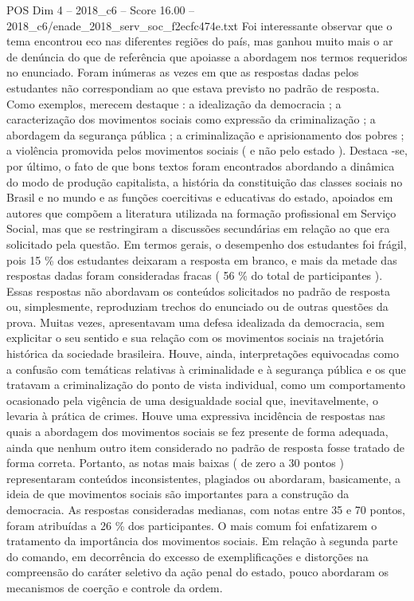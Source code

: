 \begin{textsample}{POS Dim 4 – 2018\_c6 – Score 16.00 – 2018\_c6/enade\_2018\_serv\_soc\_f2ecfc474e.txt}
Foi interessante observar que o tema encontrou eco nas diferentes regiões do país, mas ganhou muito mais o ar de denúncia do que de referência que apoiasse a abordagem nos termos requeridos no enunciado.
Foram inúmeras as vezes em que as respostas dadas pelos estudantes não correspondiam ao que estava previsto no padrão de resposta.
Como exemplos, merecem destaque : a idealização da democracia ; a caracterização dos movimentos sociais como expressão da criminalização ; a abordagem da segurança pública ; a criminalização e aprisionamento dos pobres ; a violência promovida pelos movimentos sociais ( e não pelo estado ).
Destaca -se, por último, o fato de que bons textos foram encontrados abordando a dinâmica do modo de produção capitalista, a história da constituição das classes sociais no Brasil e no mundo e as funções coercitivas e educativas do estado, apoiados em autores que compõem a literatura utilizada na formação profissional em Serviço Social, mas que se restringiram a discussões secundárias em relação ao que era solicitado pela questão.
Em termos gerais, o desempenho dos estudantes foi frágil, pois 15 \% dos estudantes deixaram a resposta em branco, e mais da metade das respostas dadas foram consideradas fracas ( 56 \% do total de participantes ).
Essas respostas não abordavam os conteúdos solicitados no padrão de resposta ou, simplesmente, reproduziam trechos do enunciado ou de outras questões da prova.
Muitas vezes, apresentavam uma defesa idealizada da democracia, sem explicitar o seu sentido e sua relação com os movimentos sociais na trajetória histórica da sociedade brasileira.
Houve, ainda, interpretações equivocadas como a confusão com temáticas relativas à criminalidade e à segurança pública e os que tratavam a criminalização do ponto de vista individual, como um comportamento ocasionado pela vigência de uma desigualdade social que, inevitavelmente, o levaria à prática de crimes.
Houve uma expressiva incidência de respostas nas quais a abordagem dos movimentos sociais se fez presente de forma adequada, ainda que nenhum outro item considerado no padrão de resposta fosse tratado de forma correta.
Portanto, as notas mais baixas ( de zero a 30 pontos ) representaram conteúdos inconsistentes, plagiados ou abordaram, basicamente, a ideia de que movimentos sociais são importantes para a construção da democracia.
As respostas consideradas medianas, com notas entre 35 e 70 pontos, foram atribuídas a 26 \% dos participantes.
O mais comum foi enfatizarem o tratamento da importância dos movimentos sociais.
Em relação à segunda parte do comando, em decorrência do excesso de exemplificações e distorções na compreensão do caráter seletivo da ação penal do estado, pouco abordaram os mecanismos de coerção e controle da ordem.

\end{textsample}
